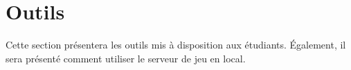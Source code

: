 \section{Outils} %
\label{outils}

Cette section présentera les outils mis à disposition aux étudiants.
Également, il sera présenté comment utiliser le serveur de jeu en local.

